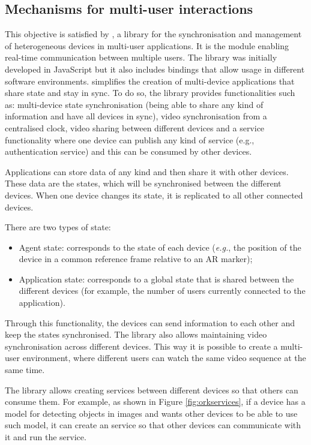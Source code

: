 \subsection{Mechanisms for multi-user interactions}\label{sec:architecture:multiuser}

This objective is satisfied by \ork{} \citep{10.1007/978-3-030-93907-6_106}, a library for the synchronisation and management of heterogeneous devices in multi-user applications. It is the module enabling real-time communication between multiple users. The library was initially developed in JavaScript but it also includes bindings that allow usage in different software environments.
\ork{} simplifies the creation of multi-device applications that share state and stay in sync. To do so, the library provides functionalities such as: multi-device state synchronisation (being able to share any kind of information and have all devices in sync), video synchronisation from a centralised clock, video sharing between different devices and a service functionality where one device can publish any kind of service (e.g., authentication service) and this can be consumed by other devices.

Applications can store data of any kind and then share it with other devices. These data are the states, which will be synchronised between the different devices. When one device changes its state, it is replicated to all other connected devices.

There are two types of state:
\begin{itemize}
    \item Agent state: corresponds to the state of each device (\textit{e.g.}, the position of the device in a common reference frame relative to an AR marker);
    \item Application state: corresponds to a global state that is shared between the different devices (for example, the number of users currently connected to the application).
\end{itemize}

Through this functionality, the devices can send information to each other and keep the states synchronised. The library also allows maintaining video  synchronisation across different devices. This way it is possible to create a multi-user environment, where different users can watch the same video sequence at the same time. 

The library allows creating services between different devices so that others can consume them. For example, as shown in Figure \ref{fig:orkservices}, if a device has a model for detecting objects in images and wants other devices to be able to use such model, it can create an \ork{} service so that other devices can communicate with it and run the service.

